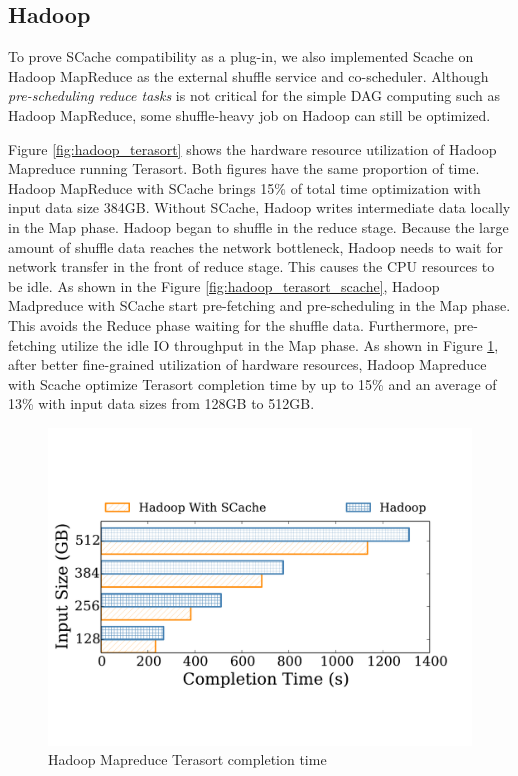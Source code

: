 {\color{blue}
\subsection{Hadoop}

To prove SCache compatibility as a plug-in, we also implemented Scache on Hadoop MapReduce as the external shuffle service and co-scheduler. Although \textit{pre-scheduling reduce tasks} is not critical for the simple DAG computing such as Hadoop MapReduce, some shuffle-heavy job on Hadoop can still be optimized.

Figure \ref{fig:hadoop_terasort} shows the hardware resource utilization of Hadoop Mapreduce running Terasort. Both figures have the same proportion of time. Hadoop MapReduce with SCache brings 15\% of total time optimization with input data size 384GB. Without SCache, Hadoop writes intermediate data locally in the Map phase. Hadoop began to shuffle in the reduce stage. Because the large amount of shuffle data reaches the network bottleneck, Hadoop needs to wait for network transfer in the front of reduce stage. This causes the CPU resources to be idle. As shown in the Figure \ref{fig:hadoop_terasort_scache}, Hadoop Madpreduce with SCache start pre-fetching and pre-scheduling in the Map phase. This avoids the Reduce phase waiting for the shuffle data. Furthermore, pre-fetching  utilize the idle IO throughput in the Map phase. As shown in Figure \ref{fig:hadoop_terasort_time}, after better fine-grained utilization of hardware resources, Hadoop Mapreduce with Scache optimize Terasort completion time by up to 15\% and an average of 13\% with input data sizes from 128GB to 512GB.
}

\begin{figure}
	\includegraphics[width=\linewidth]{fig/hadoop_terasort_time}
	\caption{\color{blue}Hadoop Mapreduce Terasort completion time}
	\label{fig:hadoop_terasort_time}
\end{figure}


